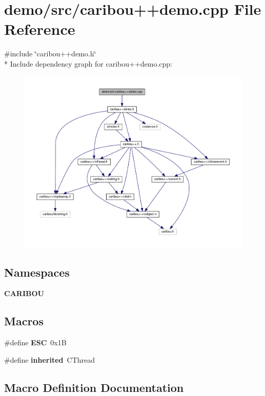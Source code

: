 \section{demo/src/caribou++demo.cpp File Reference}
\label{caribou_09_09demo_8cpp}
{\ttfamily \#include \char`\"{}caribou++demo.\-h\char`\"{}}\\*
Include dependency graph for caribou++demo.cpp\-:\nopagebreak
\begin{figure}[H]
\begin{center}
\leavevmode
\includegraphics[width=350pt]{caribou_09_09demo_8cpp__incl}
\end{center}
\end{figure}
\subsection*{Namespaces}
\begin{DoxyCompactItemize}
\item 
{\bf C\-A\-R\-I\-B\-O\-U}
\end{DoxyCompactItemize}
\subsection*{Macros}
\begin{DoxyCompactItemize}
\item 
\#define {\bf E\-S\-C}~0x1\-B
\item 
\#define {\bf inherited}~C\-Thread
\end{DoxyCompactItemize}


\subsection{Macro Definition Documentation}
